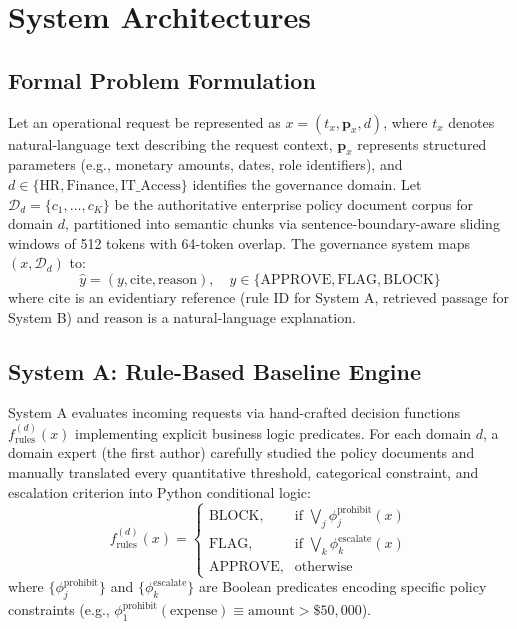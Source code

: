 \documentclass[sigconf,screen]{acmart}
\begin{document}
\section{System Architectures}

\subsection{Formal Problem Formulation}
Let an operational request be represented as $x = (t_x, \mathbf{p}_x, d)$, where $t_x$ denotes natural-language text describing the request context, $\mathbf{p}_x$ represents structured parameters (e.g., monetary amounts, dates, role identifiers), and $d \in \{\text{HR}, \text{Finance}, \text{IT\_Access}\}$ identifies the governance domain. Let $\mathcal{D}_d = \{c_1, \dots, c_K\}$ be the authoritative enterprise policy document corpus for domain $d$, partitioned into semantic chunks via sentence-boundary-aware sliding windows of 512 tokens with 64-token overlap. The governance system maps $(x, \mathcal{D}_d)$ to:
\begin{equation}
\hat{y} = (y, \text{cite}, \text{reason}), \quad y \in \{\text{APPROVE}, \text{FLAG}, \text{BLOCK}\}
\end{equation}
where $\text{cite}$ is an evidentiary reference (rule ID for System A, retrieved passage for System B) and $\text{reason}$ is a natural-language explanation.

\subsection{System A: Rule-Based Baseline Engine}
System A evaluates incoming requests via hand-crafted decision functions $f_{\text{rules}}^{(d)}(x)$ implementing explicit business logic predicates. For each domain $d$, a domain expert (the first author) carefully studied the policy documents and manually translated every quantitative threshold, categorical constraint, and escalation criterion into Python conditional logic:
\begin{equation}
f_{\text{rules}}^{(d)}(x) = \begin{cases} 
\text{BLOCK}, & \text{if } \bigvee_{j} \phi_j^{\text{prohibit}}(x) \\
\text{FLAG}, & \text{if } \bigvee_{k} \phi_k^{\text{escalate}}(x) \\
\text{APPROVE}, & \text{otherwise}
\end{cases}
\end{equation}
where $\{\phi_j^{\text{prohibit}}\}$ and $\{\phi_k^{\text{escalate}}\}$ are Boolean predicates encoding specific policy constraints (e.g., $\phi_1^{\text{prohibit}}(\text{expense}) \equiv \text{amount} > \$50{,}000$). 
\end{document}
